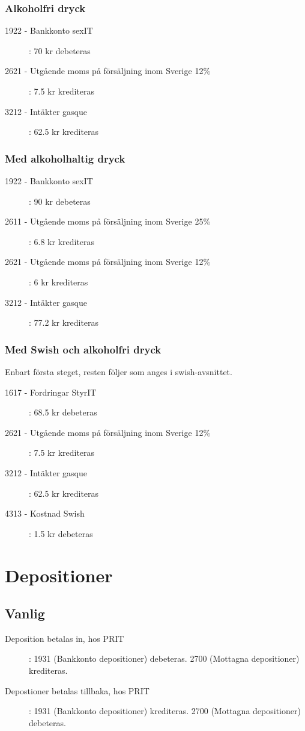 \documentclass{article}
\begin{document}
\subsubsection{Alkoholfri dryck}
\begin{description}
    \item [1922 - Bankkonto sexIT ]: 70 kr debeteras
    \item [2621 - Utgående moms på försäljning inom Sverige 12\%]: 7.5 kr krediteras
    \item [3212 - Intäkter gasque]: 62.5 kr krediteras
\end{description}
\subsubsection{Med alkoholhaltig dryck}
\begin{description}
    \item [1922 - Bankkonto sexIT ]: 90 kr debeteras
    \item [2611 - Utgående moms på försäljning inom Sverige 25\%]: 6.8 kr krediteras
    \item [2621 - Utgående moms på försäljning inom Sverige 12\%]: 6 kr krediteras
    \item [3212 - Intäkter gasque]: 77.2 kr krediteras
\end{description}
\subsubsection{Med Swish och alkoholfri dryck}
Enbart första steget, resten följer som anges i swish-avsnittet. 
\begin{description}
    \item [1617 - Fordringar StyrIT ]: 68.5 kr debeteras
    \item [2621 - Utgående moms på försäljning inom Sverige 12\%]: 7.5 kr krediteras
    \item [3212 - Intäkter gasque]: 62.5 kr krediteras
    \item [4313 - Kostnad Swish]: 1.5 kr debeteras
\end{description}
\section{Depositioner}
\subsection{Vanlig}
\begin{description}
    \item [Deposition betalas in, hos PRIT]: 1931 (Bankkonto depositioner) debeteras. 2700 (Mottagna depositioner) krediteras.
    \item [Depostioner betalas tillbaka, hos PRIT]: 1931 (Bankkonto depositioner) krediteras. 2700 (Mottagna depositioner) debeteras.
\end{description}
\end{document}
